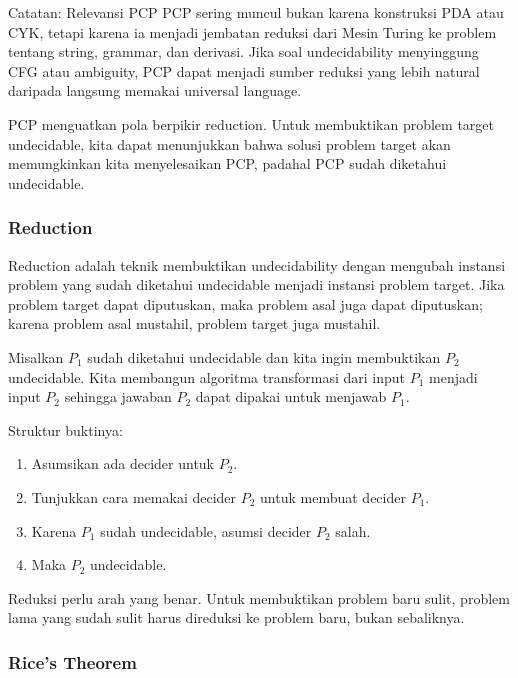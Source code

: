 \begin{cmt}{Catatan: Relevansi PCP}{}
PCP sering muncul bukan karena konstruksi PDA atau CYK, tetapi karena ia menjadi jembatan reduksi dari Mesin Turing ke problem tentang string, grammar, dan derivasi. Jika soal undecidability menyinggung CFG atau ambiguity, PCP dapat menjadi sumber reduksi yang lebih natural daripada langsung memakai universal language.
\end{cmt}

PCP menguatkan pola berpikir reduction. Untuk membuktikan problem target undecidable, kita dapat menunjukkan bahwa solusi problem target akan memungkinkan kita menyelesaikan PCP, padahal PCP sudah diketahui undecidable.

\subsubsection{Reduction}

\begin{jawab}
Reduction adalah teknik membuktikan undecidability dengan mengubah instansi problem yang sudah diketahui undecidable menjadi instansi problem target. Jika problem target dapat diputuskan, maka problem asal juga dapat diputuskan; karena problem asal mustahil, problem target juga mustahil.
\end{jawab}

Misalkan $P_1$ sudah diketahui undecidable dan kita ingin membuktikan $P_2$ undecidable. Kita membangun algoritma transformasi dari input $P_1$ menjadi input $P_2$ sehingga jawaban $P_2$ dapat dipakai untuk menjawab $P_1$.

Struktur buktinya:
\begin{enumerate}
    \item Asumsikan ada decider untuk $P_2$.
    \item Tunjukkan cara memakai decider $P_2$ untuk membuat decider $P_1$.
    \item Karena $P_1$ sudah undecidable, asumsi decider $P_2$ salah.
    \item Maka $P_2$ undecidable.
\end{enumerate}

Reduksi perlu arah yang benar. Untuk membuktikan problem baru sulit, problem lama yang sudah sulit harus direduksi ke problem baru, bukan sebaliknya.

\subsubsection{Rice's Theorem}

